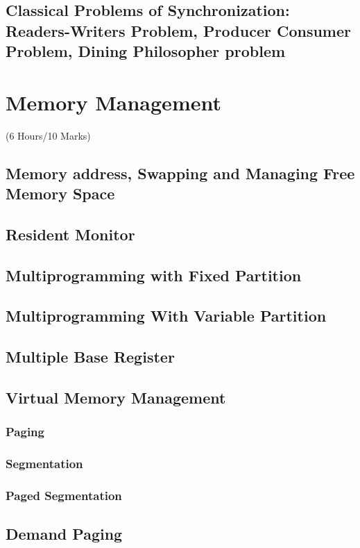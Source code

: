 \documentclass[12pt]{article}
\begin{document}
\subsection{Classical Problems of Synchronization: Readers-Writers Problem, Producer Consumer Problem, Dining Philosopher problem}

\pagebreak
\section{Memory Management}
\begin{center}(6 Hours/10 Marks)\end{center}
\subsection{Memory address, Swapping and Managing Free Memory Space}
\subsection{Resident Monitor}
\subsection{Multiprogramming with Fixed Partition}
\subsection{Multiprogramming With Variable Partition}
\subsection{Multiple Base Register}
\subsection{Virtual Memory Management}
\subsubsection{Paging}
\subsubsection{Segmentation}
\subsubsection{Paged Segmentation}
\subsection{Demand Paging}
\end{document}

